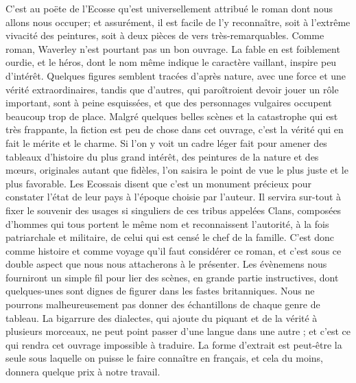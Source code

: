 C'est au poëte de l'Ecosse qu'est universellement attribué le roman dont nous allons nous occuper; et assurément, il est facile de l'y reconnaître, soit à l'extrême vivacité des peintures, soit à deux pièces de vers très-remarquables. Comme roman, Waverley n'est pourtant pas un bon ouvrage. La fable en est foiblement ourdie, et le héros, dont le nom même indique le caractère vaillant, inspire peu d'intérêt. Quelques figures semblent tracées d'après nature, avec une force et une vérité extraordinaires, tandis que d'autres, qui paroîtroient devoir jouer un rôle\setcounter{page}{535} important, sont à peine esquissées, et que des personnages vulgaires occupent beaucoup trop de place. Malgré quelques belles scènes et la catastrophe qui est très frappante, la fiction est peu de chose dans cet ouvrage, c’est la vérité qui en fait le mérite et le charme. Si l’on y voit un cadre léger fait pour amener des tableaux d’histoire du plus grand intérêt, des peintures de la nature et des mœurs, originales autant que fidèles, l’on saisira le point de vue le plus juste et le plus favorable. Les Ecossais disent que c’est un monument précieux pour constater l’état de leur pays à l’époque choisie par l’auteur. Il servira sur-tout à fixer le souvenir des usages si singuliers de ces tribus appelées Clans, composées d’hommes qui tous portent le même nom et reconnaissent l’autorité, à la fois patriarchale et militaire, de celui qui est censé le chef de la famille. C’est donc comme histoire et comme voyage qu’il faut considérer ce roman, et c’est sous ce double aspect que nous nous attacherons à le présenter. Les évènemens nous fourniront un simple fil pour lier des scènes, en grande partie instructives, dont quelques-unes sont dignes de figurer dans les fastes britanniques. Nous ne pourrons malheureusement pas donner des échantillons de chaque genre de tableau.\setcounter{page}{536} La bigarrure des dialectes, qui ajoute du piquant et de la vérité à plusieurs morceaux, ne peut point passer d'une langue dans une autre ; et c'est ce qui rendra cet ouvrage impossible à traduire. La forme d'extrait est peut-être la seule sous laquelle on puisse le faire connaître en français, et cela du moins, donnera quelque prix à notre travail.
